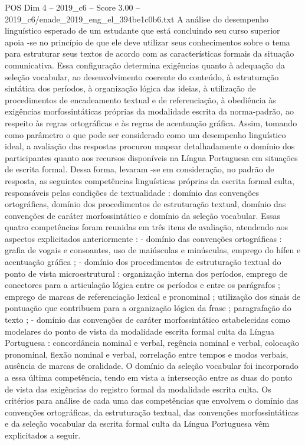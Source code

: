\begin{textsample}{POS Dim 4 – 2019\_c6 – Score 3.00 – 2019\_c6/enade\_2019\_eng\_el\_394be1c0b6.txt}
A análise do desempenho linguístico esperado de um estudante que está concluindo seu curso superior apoia -se no princípio de que ele deve utilizar seus conhecimentos sobre o tema para estruturar seus textos de acordo com as características formais da situação comunicativa.
Essa configuração determina exigências quanto à adequação da seleção vocabular, ao desenvolvimento coerente do conteúdo, à estruturação sintática dos períodos, à organização lógica das ideias, à utilização de procedimentos de encadeamento textual e de referenciação, à obediência às exigências morfossintáticas próprias da modalidade escrita da norma-padrão, ao respeito às regras ortográficas e às regras de acentuação gráfica.
Assim, tomando como parâmetro o que pode ser considerado como um desempenho linguístico ideal, a avaliação das respostas procurou mapear detalhadamente o domínio dos participantes quanto aos recursos disponíveis na Língua Portuguesa em situações de escrita formal.
Dessa forma, levaram -se em consideração, no padrão de resposta, as seguintes competências linguísticas próprias da escrita formal culta, responsáveis pelas condições de textualidade : domínio das convenções ortográficas, domínio dos procedimentos de estruturação textual, domínio das convenções de caráter morfossintático e domínio da seleção vocabular.
Essas quatro competências foram reunidas em três itens de avaliação, atendendo aos aspectos explicitados anteriormente : - domínio das convenções ortográficas : grafia de vogais e consoantes, uso de maiúsculas e minúsculas, emprego do hífen e acentuação gráfica ; - domínio dos procedimentos de estruturação textual do ponto de vista microestrutural : organização interna dos períodos, emprego de conectores para a articulação lógica entre os períodos e entre os parágrafos ; emprego de marcas de referenciação lexical e pronominal ; utilização dos sinais de pontuação que contribuem para a organização lógica da frase ; paragrafação do texto ; - domínio das convenções de caráter morfossintático estabelecidas como modelares do ponto de vista da modalidade escrita formal culta da Língua Portuguesa : concordância nominal e verbal, regência nominal e verbal, colocação pronominal, flexão nominal e verbal, correlação entre tempos e modos verbais, ausência de marcas de oralidade.
O domínio da seleção vocabular foi incorporado a essa última competência, tendo em vista a intersecção entre as duas do ponto de vista das exigências do registro formal da modalidade escrita culta.
Os critérios para análise de cada uma das competências que envolvem o domínio das convenções ortográficas, da estruturação textual, das convenções morfossintáticas e da seleção vocabular da escrita formal culta da Língua Portuguesa vêm explicitados a seguir.

\end{textsample}
